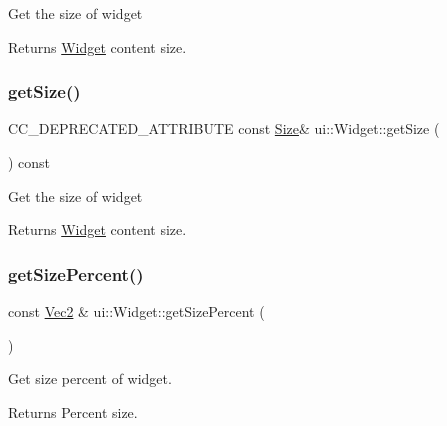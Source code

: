 Get the size of widget

\begin{DoxyReturn}{Returns}
\hyperlink{classui_1_1Widget}{Widget} content size. 
\end{DoxyReturn}
\mbox{\label{classui_1_1Widget_ad26f6b24c6d5c529c800783b09478f82}} 
\subsubsection{\texorpdfstring{get\+Size()}{getSize()}\hspace{0.1cm}{\footnotesize\ttfamily [2/2]}}
{\footnotesize\ttfamily C\+C\+\_\+\+D\+E\+P\+R\+E\+C\+A\+T\+E\+D\+\_\+\+A\+T\+T\+R\+I\+B\+U\+TE const \hyperlink{classSize}{Size}\& ui\+::\+Widget\+::get\+Size (\begin{DoxyParamCaption}{ }\end{DoxyParamCaption}) const}

Get the size of widget

\begin{DoxyReturn}{Returns}
\hyperlink{classui_1_1Widget}{Widget} content size. 
\end{DoxyReturn}
\mbox{\label{classui_1_1Widget_a5621f3e1ffe53f3dfb844d0d9dace4ba}} 
\subsubsection{\texorpdfstring{get\+Size\+Percent()}{getSizePercent()}\hspace{0.1cm}{\footnotesize\ttfamily [1/2]}}
{\footnotesize\ttfamily const \hyperlink{classVec2}{Vec2} \& ui\+::\+Widget\+::get\+Size\+Percent (\begin{DoxyParamCaption}{ }\end{DoxyParamCaption})}

Get size percent of widget.

\begin{DoxyReturn}{Returns}
Percent size. 
\end{DoxyReturn}
\mbox{\label{classui_1_1Widget_afd245724f3c02d72f56c11f45c765ced}} 
